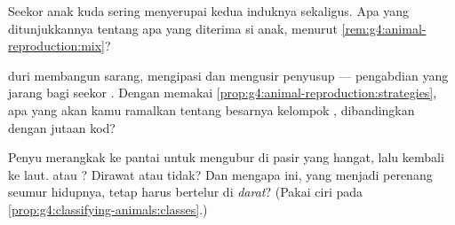 \begin{exercise}[$\star\star$]\label{exo:g4:animal-reproduction:9}
Seekor anak kuda sering menyerupai kedua induknya sekaligus. Apa yang
ditunjukkannya tentang apa yang diterima si anak, menurut
\cref{rem:g4:animal-reproduction:mix}?
\end{exercise}

\begin{exercise}[$\star\star$]\label{exo:g4:animal-reproduction:10}
 duri  membangun sarang, mengipasi  dan mengusir
penyusup --- pengabdian yang jarang bagi seekor . Dengan memakai
\cref{prop:g4:animal-reproduction:strategies}, apa yang akan kamu
ramalkan tentang besarnya kelompok , dibandingkan dengan
jutaan   kod?
\end{exercise}

\begin{exercise}[$\star\star\star$]\label{exo:g4:animal-reproduction:11}
Penyu merangkak ke pantai untuk mengubur  di pasir yang
hangat, lalu kembali ke laut.  atau ? Dirawat atau tidak?
Dan mengapa  ini, yang menjadi perenang seumur hidupnya, tetap
harus bertelur di \emph{darat}? (Pakai ciri  pada
\cref{prop:g4:classifying-animals:classes}.)
\end{exercise}
